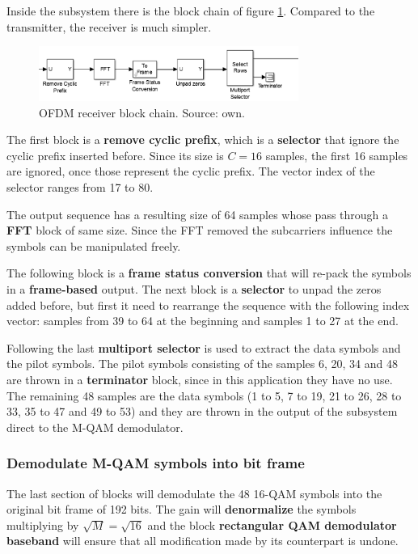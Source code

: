 Inside the subsystem there is the block chain of figure \ref{fig:ofdm:3}. Compared to the transmitter, the receiver is much simpler.

\begin{figure}[h]
\begin{center}
\includegraphics[width=8.5cm]{images/RX1.png}
\caption{OFDM receiver block chain. Source: own.}
\label{fig:ofdm:3} 
\end{center}
\end{figure}

The first block is a \textbf{remove cyclic prefix}, which is a \textbf{selector} that ignore the cyclic prefix inserted before. Since its size is $C=16$ samples, the first 16 samples are ignored, once those represent the cyclic prefix. The vector index of the selector ranges from 17 to 80. 

The output sequence has a resulting size of 64 samples whose pass through a \textbf{FFT} block of same size. Since the FFT removed the subcarriers influence the symbols can be manipulated freely.

The following block is a \textbf{frame status conversion} that will re-pack the symbols in a \textbf{frame-based} output. The next block is a \textbf{selector} to unpad the zeros added before, but first it need to rearrange the sequence with the following index vector: samples from 39 to 64 at the beginning and samples 1 to 27 at the end. 

Following the last \textbf{multiport selector} is used to extract the data symbols and the pilot symbols. The pilot symbols consisting of the samples 6, 20, 34 and 48 are thrown in a \textbf{terminator} block, since in this application they have no use. The remaining 48 samples are the data symbols (1 to 5, 7 to 19, 21 to 26, 28 to 33, 35 to 47 and 49 to 53) and they are thrown in the output of the subsystem direct to the M-QAM demodulator.

\subsubsection{Demodulate M-QAM symbols into bit frame}

The last section of blocks will demodulate the 48 16-QAM symbols into the original bit frame of 192 bits. The gain will \textbf{denormalize} the symbols multiplying by $\sqrt{M} = \sqrt{16}$ and the block \textbf{rectangular QAM demodulator baseband} will ensure that all modification made by its counterpart is undone.

